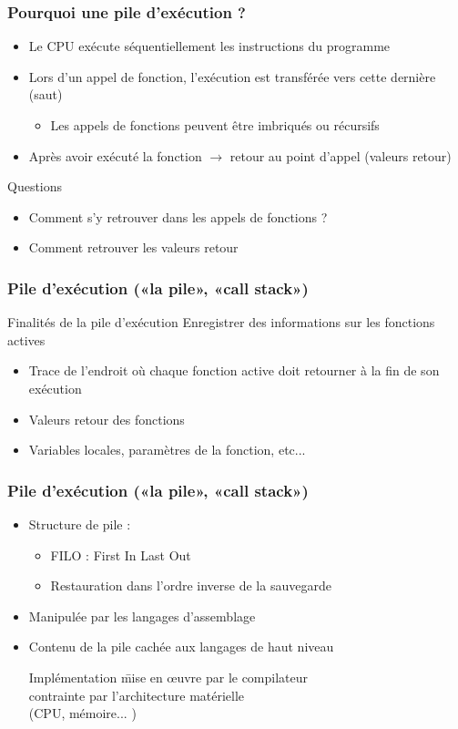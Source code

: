 \begin{frame}
\frametitle{Pourquoi une pile d'exécution ?}
\begin{itemize}
\item Le CPU exécute séquentiellement les instructions du programme
\item Lors d'un appel de fonction, l'exécution est transférée vers cette dernière (saut)
\begin{itemize}
\item Les appels de fonctions peuvent être imbriqués ou récursifs
\end{itemize}
\item Après avoir exécuté la fonction $\rightarrow$ retour au point d'appel (valeurs retour)
\end{itemize}
\begin{block}{Questions}
\begin{itemize}
\item Comment s'y retrouver dans les appels de fonctions ?
\item Comment retrouver les valeurs retour
\end{itemize}

\end{block}
\end{frame}

\begin{frame}
\frametitle{Pile d'exécution («la pile», «call stack»)}
\begin{block}{Finalités de la pile d'exécution}
Enregistrer des informations sur les fonctions actives 
\begin{itemize}
\item Trace de l'endroit où chaque fonction active doit retourner à la fin de son exécution
\item Valeurs retour des fonctions
\item Variables locales, paramètres de la fonction, etc...
\end{itemize}
\end{block}
\end{frame}

\begin{frame}
\frametitle{Pile d'exécution («la pile», «call stack»)}
\begin{itemize}
\item Structure de pile :
\begin{itemize}
\item FILO : First In Last Out
\item Restauration dans l'ordre inverse de la sauvegarde
\end{itemize}

\item <2->Manipulée par les langages d'assemblage
\item <2->Contenu de la pile cachée aux langages de haut niveau
\begin{tabbing}
Implémentation \= mise en œuvre par le compilateur \\
\> contrainte par l'architecture matérielle \\ \>(CPU, mémoire... )
\end{tabbing}
\end{itemize}
\end{frame}


